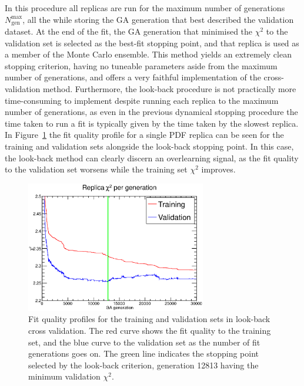 In this procedure all replicas are run for the maximum number of generations $N_{\text{gen}}^{\text{max}}$, all the while storing the GA generation that best described the validation dataset. At the end of the fit, the GA generation that minimised the $\chi^2$ to the validation set is selected as the best-fit stopping point, and that replica is used as a member of the Monte Carlo ensemble. This method yields an extremely clean stopping criterion, having no tuneable parameters aside from the maximum number of generations, and offers a very faithful implementation of the cross-validation method. Furthermore, the look-back procedure is not practically more time-consuming to implement despite running each replica to the maximum number of generations, as even in the previous dynamical stopping procedure the time taken to run a fit is typically given by the time taken by the slowest replica. In Figure~\ref{fig:LBCVchi2prof} the fit quality profile for a single PDF replica can be seen for the training and validation sets alongside the look-back stopping point. In this case, the look-back method can clearly discern an overlearning signal, as the fit quality to the validation set worsens while the training set $\chi^2$ improves.

\begin{figure}[!]
\centering
\includegraphics[width=0.7\textwidth]{7-PostLHC/figs/lookbackchi2prof.eps}
\caption[Fit quality profiles for the training and validation sets in look-back cross validation]{Fit quality profiles for the training and validation sets in look-back cross validation. The red curve shows the fit quality to the training set, and the blue curve to the validation set as the number of fit generations goes on. The green line indicates the stopping point selected by the look-back criterion, generation 12813 having the minimum validation $\chi^2$.}
\label{fig:LBCVchi2prof}
\end{figure}


